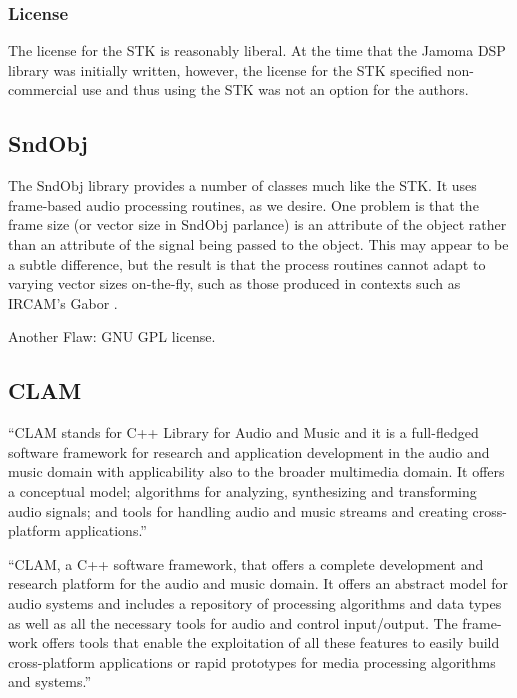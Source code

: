 \documentclass[twoside,10pt]{article}
\begin{document}
\subsubsection{License}
The license for the STK is reasonably liberal.  At the time that the Jamoma DSP library was initially written, however, the license for the STK specified non-commercial use and thus using the STK was not an option for the authors.  


\subsection{SndObj} %

The SndObj\cite{Lazzarini:2001} library provides a number of classes much like the STK.  It uses frame-based audio processing routines, as we desire.  One problem is that the frame size (or vector size in SndObj parlance) is an attribute of the object rather than an attribute of the signal being passed to the object.  This may appear to be a subtle difference, but the result is that the process routines cannot adapt to varying vector sizes on-the-fly, such as those produced in contexts such as IRCAM's Gabor \cite{Schnell:2005_Gabor}.


Another Flaw: GNU GPL license.




\subsection{CLAM} %

``CLAM stands for C++ Library for Audio and Music and it is a full-fledged software framework for research and application development in the audio and music domain with applicability also to the broader multimedia domain. It offers a conceptual model; algorithms for analyzing, synthesizing and transforming audio signals; and tools for handling audio and music streams and creating cross-platform applications.''

``CLAM, a C++ software framework, that offers a complete development and research platform for the audio and music domain. It offers an abstract model for audio systems and includes a repository of processing algorithms and data types as well as all the necessary tools for audio and control input/output. The frame- work offers tools that enable the exploitation of all these features to easily build cross-platform applications or rapid prototypes for media processing algorithms and systems.'' \cite{Amatraian:2008}
\end{document}
